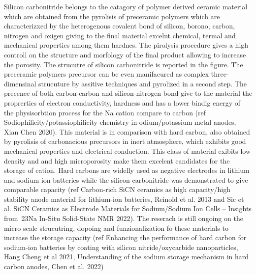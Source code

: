 Silicon carbonitride belongs to the catagory of polymer derived ceramic material which are obtained from the pyrolisis of preceramic polymers which are characterizxed by the heterogenous covalent bond of silicon, borono, carbon, nitrogen and oxigen giving to the final material excelnt chemical, termal and mechanical properties among them hardnes. The pirolysis procedure gives a high controll on the structure and morfology of the final product allowing to increase the porosity. The strucutre of silicon carbonitride is reported in the figure. The preceramic polymers precursor can be even manifacured as complex three-dimensinal strucuture by assitive techniques and pyrolized in a second step.
The precence of both carbon-carbon and silicon-nitrogen bond give to the material the proprerties of electron conductivity, hardness and has a lower bindig energy of the physisorbtion process for the Na cation compare to carbon (ref Sodiophilicity/potassiophilicity chemistry in odium/potassium metal anodes, Xian Chen 2020). This material is in comparison with hard carbon, also obtained by pyrolisis of carbonacious precursors in inert atmosphere, which exhibits good mechanical properties and electrical conduction. This class of material exibits low density and and high microporosity make them excelent candidates for the storage of cation. Hard carbons are widelly used as negative electrodes in lithium and sodium ion batteries while the silicon carbonitride was demonstrated to give comparable capacity (ref Carbon-rich SiCN ceramics as high capacity/high stability anode material for lithium-ion batteries, Reinold et al. 2013 and Sic et al. SiCN Ceramics as Electrode Materials for Sodium/Sodium Ion Cells – Insights from 23Na In-Situ Solid-State NMR 2022). The reserach is still ongoing on the micro scale strucutring, dopoing and funzionalization fo these materials to increase the storage capacity (ref Enhancing the performance of hard carbon for sodium-ion batteries by coating with silicon nitride/oxycarbide nanoparticles, Hang Cheng et al 2021, Understanding of the sodium storage mechanism in hard carbon anodes, Chen et al. 2022)

